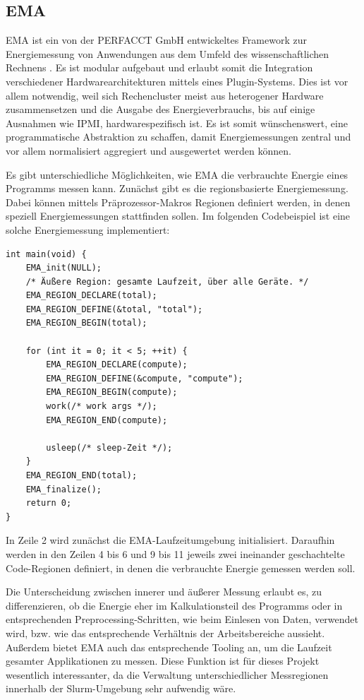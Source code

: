 \documentclass[paper=a4, fontsize=11pt]{scrartcl} %
\numberwithin{equation}{section} %
\numberwithin{figure}{section} %
\numberwithin{table}{section} %
\begin{document}
\subsection{EMA}
EMA ist ein von der PERFACCT GmbH entwickeltes Framework zur Energiemessung von Anwendungen aus dem Umfeld des wissenschaftlichen Rechnens \cite{perfacct_naaice}. Es ist modular aufgebaut und erlaubt somit die Integration verschiedener Hardwarearchitekturen mittels eines Plugin-Systems. Dies ist vor allem notwendig, weil sich Rechencluster meist aus heterogener Hardware zusammensetzen und die Ausgabe des Energieverbrauchs, bis auf einige Ausnahmen wie IPMI, hardwarespezifisch ist. Es ist somit wünschenswert, eine programmatische Abstraktion zu schaffen, damit Energiemessungen zentral und vor allem normalisiert aggregiert und ausgewertet werden können.

Es gibt unterschiedliche Möglichkeiten, wie EMA die verbrauchte Energie eines Programms messen kann. Zunächst gibt es die regionsbasierte Energiemessung. Dabei können mittels Präprozessor-Makros Regionen definiert werden, in denen speziell Energiemessungen stattfinden sollen. Im folgenden Codebeispiel ist eine solche Energiemessung implementiert:
\begin{verbatim}
int main(void) {
    EMA_init(NULL);
    /* Äußere Region: gesamte Laufzeit, über alle Geräte. */
    EMA_REGION_DECLARE(total);
    EMA_REGION_DEFINE(&total, "total");
    EMA_REGION_BEGIN(total);
    
    for (int it = 0; it < 5; ++it) {
        EMA_REGION_DECLARE(compute);
        EMA_REGION_DEFINE(&compute, "compute");
        EMA_REGION_BEGIN(compute);
        work(/* work args */);
        EMA_REGION_END(compute);

        usleep(/* sleep-Zeit */);
    }
    EMA_REGION_END(total);
    EMA_finalize();
    return 0;
}
\end{verbatim}
In Zeile 2 wird zunächst die EMA-Laufzeitumgebung initialisiert. Daraufhin werden in den Zeilen 4 bis 6 und 9 bis 11 jeweils zwei ineinander geschachtelte Code-Regionen definiert, in denen die verbrauchte Energie gemessen werden soll. 

Die Unterscheidung zwischen innerer und äußerer Messung erlaubt es, zu differenzieren, ob die Energie eher im Kalkulationsteil des Programms oder in entsprechenden Preprocessing-Schritten, wie beim Einlesen von Daten, verwendet wird, bzw. wie das entsprechende Verhältnis der Arbeitsbereiche aussieht. Außerdem bietet EMA auch das entsprechende Tooling an, um die Laufzeit gesamter Applikationen zu messen. Diese Funktion ist für dieses Projekt wesentlich interessanter, da die Verwaltung unterschiedlicher Messregionen innerhalb der Slurm-Umgebung sehr aufwendig wäre.
\end{document}
